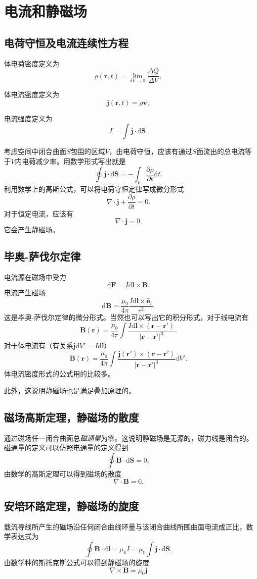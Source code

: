 \documentclass[UTF8]{ctexbook}
\renewcommand{\d}{\mathrm{d}}
\renewcommand{\b}{\boldsymbol}
\numberwithin{equation}{chapter}
\begin{document}
	\section{电流和静磁场}
	\subsection{电荷守恒及电流连续性方程}
	体电荷密度定义为
	\[\rho(\b{r},t)=\lim_{\delta V\rightarrow 0}\frac{\Delta Q}{\Delta V},\]
	
	体电流密度定义为
	\[\b{j}(\b{r},t)=\rho\b{v},\]
	
	电流强度定义为
	\[I=\int\b{j}\cdot\d\b{S}.\]
	
	考虑空间中闭合曲面$S$包围的区域$V$，由电荷守恒，应该有通过$S$面流出的总电流等于$V$内电荷减少率。用数学形式写出就是
	\[\oint\b{j}\cdot\d\b{S}=-\int_V \frac{\partial \rho}{\partial t}\d t.\]
	利用数学上的高斯公式，可以将电荷守恒定律写成微分形式
	\[\nabla\cdot\b{j}+\frac{\partial \rho}{\partial t}=0.\]
	对于恒定电流，应该有
	\[\nabla\cdot\b{j}=0.\]
	它会产生静磁场。
	
	\subsection{毕奥-萨伐尔定律}
	电流源在磁场中受力
	\[\d\b{F}=I\d\b{l}\times\b{B}.\]
	电流产生磁场
	\[\d\b{B}=\frac{\mu_0}{4\pi}\frac{I\d\b{l}\times\hat{\b{e}}_r}{r^2}.\]
	这是毕奥-萨伐尔定律的微分形式。当然也可以写出它的积分形式，对于线电流有
	\[\b{B}(\b{r})=\frac{\mu_0}{4\pi}\int\frac{I\d\b{l}\times(\b{r}-\b{r}')}{|\b{r}-\b{r}'|^3}.\]
	对于体电流有（有关系$\b{j}\d V'=I\d\b{l}$）
	\[\b{B}(\b{r})=\frac{\mu_0}{4\pi}\int\frac{\b{j}(\b{r}')\times(\b{r}-\b{r}')}{|\b{r}-\b{r}'|^3}\d V'.\]
	体电流密度形式的公式用的比较多。
	
	此外，这说明静磁场也是满足叠加原理的。
	
	\subsection{磁场高斯定理，静磁场的散度}
	通过磁场任一闭合曲面总\emph{磁通量}为零。这说明静磁场是无源的，磁力线是闭合的。磁通量的定义可以仿照电通量的定义得到
	\[\oint \b{B}\cdot\d\b{S}=0,\]
	由数学的高斯定理可以得到磁场的散度
	\[\nabla\cdot\b{B}=0.\]
	
	\subsection{安培环路定理，静磁场的旋度}
	载流导线所产生的磁场沿任何闭合曲线环量与该闭合曲线所围曲面电流成正比，数学表达式为
	\[\oint\b{B}\cdot\d \b{l}=\mu_0 I=\mu_0\int \b{j}\cdot\d\b{S}.\]
	由数学种的斯托克斯公式可以得到静磁场的旋度
	\[\nabla\times \b{B}=\mu_0\b{j}\]
	
\end{document}
